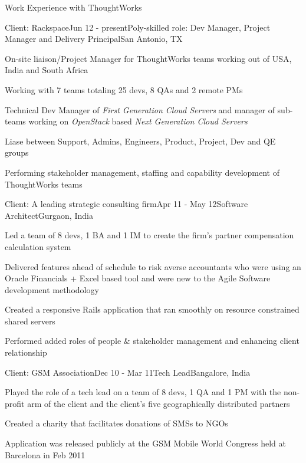 \documentclass{resume} %
\begin{document}

\begin{rSection}{Work Experience with ThoughtWorks}

\begin{rSubsection}{Client: Rackspace}{Jun 12 - present}{Poly-skilled role: Dev Manager, Project Manager and Delivery Principal}{San Antonio, TX}
\item On-site liaison/Project Manager for ThoughtWorks teams working
  out of USA, India and South Africa
\item Working with 7 teams totaling 25 devs, 8 QAs and 2 remote PMs
\item Technical Dev Manager of {\em First Generation Cloud Servers}
  and manager of sub-teams working on {\em OpenStack} based {\em Next Generation Cloud Servers}
\item Liase between Support, Admins, Engineers, Product, Project, Dev and QE groups
\item Performing stakeholder management, staffing and capability development of ThoughtWorks teams
\end{rSubsection}


\begin{rSubsection}{Client: A leading strategic consulting firm}{Apr 11 - May 12}{Software Architect}{Gurgaon, India}
\item Led a team of 8 devs, 1 BA and 1 IM to create the firm's partner compensation calculation system
\item Delivered features ahead of schedule to risk averse accountants who were using an Oracle Financials + Excel based tool and were new to the Agile Software development methodology
\item Created a responsive Rails application that ran smoothly on resource constrained shared servers
\item Performed added roles of people \& stakeholder management and enhancing client relationship
\end{rSubsection}


\begin{rSubsection}{Client: GSM Association}{Dec 10 - Mar 11}{Tech Lead}{Bangalore, India}
\item Played the role of a tech lead on a team of 8 devs, 1 QA and 1
  PM with the non-profit arm of the client and the client's five
  geographically distributed partners
\item Created a charity that facilitates donations of SMSs to NGOs
\item Application was released publicly at the GSM Mobile World Congress held at Barcelona in Feb 2011
\end{rSubsection}



\end{rSection}
\end{document}
